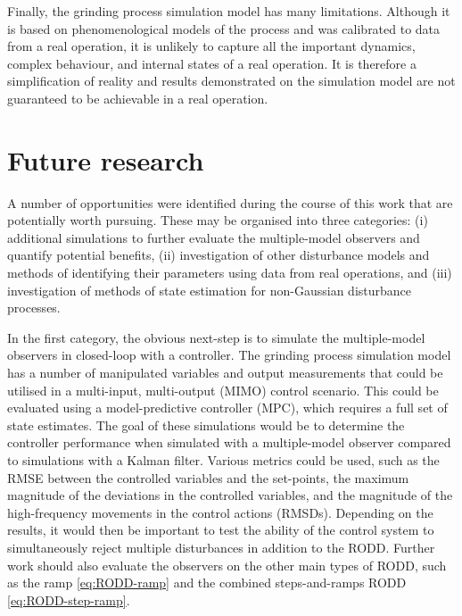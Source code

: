 Finally, the grinding process simulation model has many limitations. Although it is based on phenomenological models of the process and was calibrated to data from a real operation, it is unlikely to capture all the important dynamics, complex behaviour, and internal states of a real operation. It is therefore a simplification of reality and results demonstrated on the simulation model are not guaranteed to be achievable in a real operation.

\section{Future research} \label{sec:future-research}

A number of opportunities were identified during the course of this work that are potentially worth pursuing. These may be organised into three categories: (i) additional simulations to further evaluate the multiple-model observers and quantify potential benefits, (ii) investigation of other disturbance models and methods of identifying their parameters using data from real operations, and (iii) investigation of methods of state estimation for non-Gaussian disturbance processes.

In the first category, the obvious next-step is to simulate the multiple-model observers in closed-loop with a controller. The grinding process simulation model has a number of manipulated variables and output measurements that could be utilised in a multi-input, multi-output (\gls{MIMO}) control scenario. This could be evaluated using a model-predictive controller (\gls{MPC}), which requires a full set of state estimates. 
The goal of these simulations would be to determine the controller performance when simulated with a multiple-model observer compared to simulations with a Kalman filter. Various metrics could be used, such as the \gls{RMSE} between the controlled variables and the set-points, the maximum magnitude of the deviations in the controlled variables, and the magnitude of the high-frequency movements in the control actions (\gls{RMSD}s). Depending on the results, it would then be important to test the ability of the control system to simultaneously reject multiple disturbances in addition to the \gls{RODD}. Further work should also evaluate the observers on the other main types of \gls{RODD}, such as the ramp \eqref{eq:RODD-ramp} and the combined steps-and-ramps \gls{RODD} \eqref{eq:RODD-step-ramp}.

